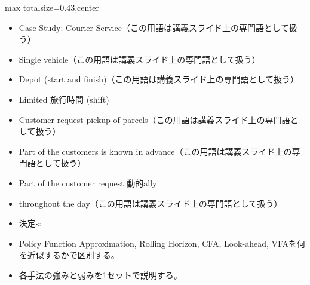 \clearpage
{}
\begin{minipage}[t]{0.405\textwidth}
\begin{adjustbox}{max totalsize={\textwidth}{0.43\textheight},center}
\begin{minipage}{\textwidth}\scriptsize
{}\begin{itemize}
\item Case Study: Courier Service（この用語は講義スライド上の専門語として扱う）
\item Single vehicle（この用語は講義スライド上の専門語として扱う）
\item Depot (start and finish)（この用語は講義スライド上の専門語として扱う）
\item Limited 旅行時間 (shift)
\item Customer request pickup of parcels（この用語は講義スライド上の専門語として扱う）
\item Part of the customers is known in advance（この用語は講義スライド上の専門語として扱う）
\item Part of the customer request 動的ally
\item throughout the day（この用語は講義スライド上の専門語として扱う）
\item 決定s:
\end{itemize}\begin{itemize}
\item Policy Function Approximation, Rolling Horizon, CFA, Look-ahead, VFAを何を近似するかで区別する。
\item 各手法の強みと弱みを1セットで説明する。
\end{itemize}
\end{minipage}
\end{adjustbox}
\end{minipage}\hfill
